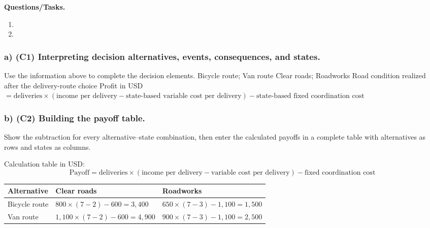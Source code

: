 \textbf{Questions/Tasks.}
\begin{enumerate}[label=\textbf{\alph*)}]
 \item {}
 \item {}
\end{enumerate}
\subsubsection*{a) \textbf{(C1)} Interpreting decision alternatives, events, consequences, and states.}
\label{subsec:problem19-farmers-market-delivery-c1}
Use the information above to complete the decision elements.
\DecisionElementsTable
{Bicycle route; Van route}
{Clear roads; Roadworks}
{Road condition realized after the delivery-route choice}
{Profit in USD $= \text{deliveries} \times (\text{income per delivery} - \text{state-based variable cost per delivery}) - \text{state-based fixed coordination cost}$}
\subsubsection*{b) \textbf{(C2)} Building the payoff table.}
\label{subsec:problem19-farmers-market-delivery-c2}
Show the subtraction for every alternative--state combination, then enter the calculated payoffs in a complete table with alternatives as rows and states as columns.

Calculation table in USD:
\[
\text{Payoff}=\text{deliveries}\times(\text{income per delivery}-\text{variable cost per delivery})-\text{fixed coordination cost}
\]
\begin{center}
\small
\begin{tabular}{lll}
\toprule
Alternative & Clear roads & Roadworks \\
\midrule
Bicycle route & $800 \times (7 - 2) - 600 = 3{,}400$ & $650 \times (7 - 3) - 1{,}100 = 1{,}500$ \\
Van route & $1{,}100 \times (7 - 2) - 600 = 4{,}900$ & $900 \times (7 - 3) - 1{,}100 = 2{,}500$ \\
\bottomrule
\end{tabular}
\end{center}

